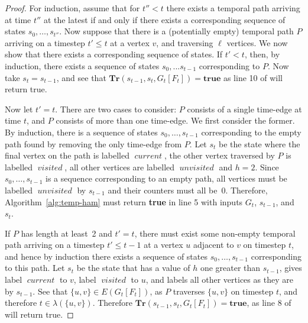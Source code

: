 \documentclass[a4paper,UKenglish,cleveref, autoref, thm-restate]{lipics-v2021} %
\DeclareMathOperator{\visited}{\textit{visited}}
\DeclareMathOperator{\unvisited}{\textit{unvisited}}
\DeclareMathOperator{\current}{\textit{current}}
\begin{document}
\begin{toappendix}
\begin{proof}
    For induction, assume that for $t''<t$ there exists a temporal path arriving at time $t''$ at the latest if and only if there exists a corresponding sequence of states $s_0,\ldots,s_{t''}$. Now suppose that there is a (potentially empty) temporal path $P$ arriving on a timestep $t' \leq t$ at a vertex $v$, and traversing $\ell$ vertices. We now show that there exists a corresponding sequence of states. If $t' < t$, then, by induction, there exists a sequence of states $s_0, ... s_{t-1}$ corresponding to $P$. Now take $s_t = s_{t-1}$, and see that $\textbf{Tr}(s_{t-1}, s_t, G_t[F_t])=\textbf{true}$ as line 10 of  will return true.

    Now let $t'=t$. There are two cases to consider: $P$ consists of a single time-edge at time $t$, and $P$ consists of more than one time-edge. We first consider the former. By induction, there is a sequence of states $s_0,\ldots, s_{t-1}$ corresponding to the empty path found by removing the only time-edge from $P$. Let $s_t$ be the state where the final vertex on the path is labelled $\current$, the other vertex traversed by $P$ is labelled $\visited$, all other vertices are labelled $\unvisited$ and $h=2$. Since $s_0,\ldots, s_{t-1}$ is a sequence corresponding to an empty path, all vertices must be labelled $\unvisited$ by $s_{t-1}$ and their counters must all be~0. Therefore, Algorithm~\ref{alg:temp-ham} must return \textbf{true} in line 5 with inputs $G_t$, $s_{t-1}$, and $s_t$.
    
    If $P$ has length at least~2 and $t'=t$, there must exist some non-empty temporal path arriving on a timestep $t' \leq t-1$ at a vertex $u$ adjacent to $v$ on timestep $t$, and hence by induction there exists a sequence of states $s_0, \ldots, s_{t-1}$ corresponding to this path. 
    Let $s_t$ be the state that has a value of $h$ one greater than $s_{t-1}$, gives label $\current$ to $v$, label $\visited$ to $u$, and labels all other vertices as they are by $s_{t-1}$. See that $\{u,v\} \in E(G_t[F_t])$, as $P$ traverses $\{u,v\}$ on timestep $t$, and therefore $t \in \lambda(\{u,v\})$. Therefore $\textbf{Tr}(s_{t-1}, s_t, G_t[F_t])=\textbf{true}$, as line 8 of  will return true.
    

\end{proof}
\end{toappendix}
\end{document}
